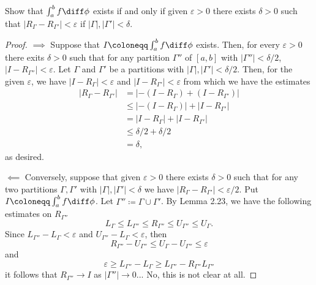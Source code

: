 \begin{problem}
Show that $\int_a^bf\diff\phi$ exists if and only if given $\varepsilon>0$
there exists $\delta>0$ such that
$\left|R_\Gamma-R_{\Gamma'}\right|<\varepsilon$ if
$|\Gamma|,|\Gamma'|<\delta$.
\end{problem}
\begin{proof}
$\implies$ Suppose that $I\coloneqq \int_a^bf\diff\phi$ exists. Then, for
every $\varepsilon>0$ there exits $\delta>0$ such that for any partition
$\Gamma''$ of $[a,b]$ with $|\Gamma''|<\delta/2$,
$|I-R_{\Gamma''}|<\varepsilon$. Let $\Gamma$ and $\Gamma'$ be a partitions
with $|\Gamma|,|\Gamma'|<\delta/2$. Then, for the given $\varepsilon$, we
have $|I-R_\Gamma|<\varepsilon$ and $|I-R_{\Gamma'}|<\varepsilon$ from
which we have the estimates
\begin{align*}
|R_\Gamma-R_{\Gamma'}|
&=\left|-(I-R_\Gamma)+(I-R_{\Gamma'})\right|\\
&\leq\left|-(I-R_\Gamma)\right|+\left|I-R_{\Gamma'}\right|\\
&=\left|I-R_\Gamma\right|+\left|I-R_{\Gamma'}\right|\\
&\leq\delta/2+\delta/2\\
&=\delta,
\end{align*}
as desired.

$\impliedby$ Conversely, suppose that given $\varepsilon>0$ there exists
$\delta>0$ such that for any two partitions $\Gamma,\Gamma'$ with
$|\Gamma|,|\Gamma'|<\delta$ we have
$|R_\Gamma-R_{\Gamma'}|<\varepsilon/2$. Put $I\coloneqq\int_a^b
f\diff\phi$. Let $\Gamma''\coloneqq\Gamma\cup\Gamma'$. By Lemma 2.23, we
have the following estimates on $R_{\Gamma''}$
\[
L_{\Gamma}\leq L_{\Gamma''}\leq R_{\Gamma''}\leq U_{\Gamma''}\leq U_{\Gamma}.
\]
Since $L_{\Gamma''}-L_{\Gamma}<\varepsilon$ and
$U_{\Gamma''}-L_{\Gamma}<\varepsilon$, then
\[
R_{\Gamma''}-U_{\Gamma''}\leq U_{\Gamma}-U_{\Gamma''}\leq \varepsilon
\]
and
\[
\varepsilon\geq L_{\Gamma''}-L_{\Gamma}\geq L_{\Gamma''}-R_{\Gamma''}L_{\Gamma''}
\]
it follows that $R_{\Gamma''}\to I$ as $|\Gamma''|\to 0$... No, this is not
clear at all.
\end{proof}
\newpage

